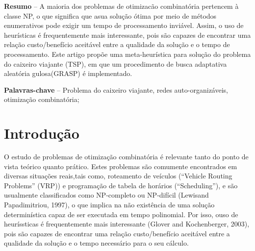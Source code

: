 \documentclass[
	article,			%
	12pt,				%
	oneside,			%
	a4paper,			%
	english,			%
	brazil,				%
	sumario=tradicional
	]{abntex2}
\date{20 de Novembro de 2018}
\affil{Universidade Estadual do Ceará \\ Departamento de ciência da computação}
\begin{document}
\textual

\pagestyle{meuestilo}

\frenchspacing 

\maketitle

\thispagestyle{meuestilo}

\begin{changemargin}{1cm}{1cm} 
 \textbf{Resumo} – A maioria dos problemas de otimizacão combinatória pertencem à classe NP, o que signiﬁca que asua solução ótima por meio de métodos enumerativos pode exigir um tempo de processamento inviável. Assim, o uso de heurísticas é frequentemente mais interessante, pois são capazes de encontrar uma relação custo/benefício aceitável entre a qualidade da solução e o tempo de processamento. Este artigo propõe uma meta-heurística para solução do problema do caixeiro viajante (TSP), em que um procedimento de busca adaptativa aleatória gulosa(GRASP) é implementado.

 \vspace{\onelineskip}
 
 \noindent
 \textbf{Palavras-chave} – Problema do caixeiro viajante, redes auto-organizáveis, otimização combinatória; 
\end{changemargin}


\section{Introdução}



O estudo de problemas de otimização combinatória é relevante tanto do ponto de vista teórico quanto prático. Estes problemas são comumente encontrados em diversas situações reais,tais como, roteamento de veículos (“Vehicle Routing Problems” (VRP)) e programação de tabela de horários (“Scheduling”), e são usualmente classiﬁcados como NP-completo ou NP-difícil 
 (Lewisand Papadimitriou, 1997), o que implica na não existência de uma solução determinística capaz de ser executada em tempo polinomial. Por isso, ouso de heuríssticas é frequentemente mais interessante (Glover and Kochenberger, 2003), pois são capazes de encontrar uma relação
 custo/benefício aceitável entre a qualidade da solução e o tempo necessário para o seu cálculo.
\end{document}
